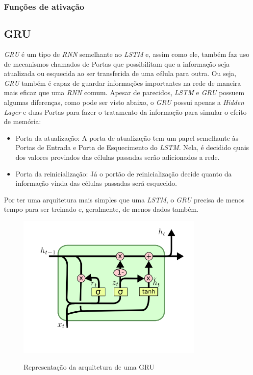 
\subsubsection{Funções de ativação}

\subsection{\acrfull{GRU}}


\textit{\acrshort{GRU}} é um tipo de \textit{\acrshort{RNN}} semelhante ao \textit{\acrshort{LSTM}} e, assim como ele, também faz uso de mecanismos chamados de Portas que possibilitam que a informação seja atualizada ou esquecida ao ser transferida de uma célula para outra. Ou seja, \textit{\acrshort{GRU}} também é capaz de guardar informações importantes na rede de maneira mais eficaz que uma \textit{\acrshort{RNN}} comum. Apesar de parecidos, \textit{\acrshort{LSTM}} e \textit{\acrshort{GRU}} possuem algumas diferenças, como pode ser visto abaixo, o \textit{\acrshort{GRU}} possui apenas a \textit{Hidden Layer} e duas Portas para fazer o tratamento da informação para simular o efeito de memória:

\begin{itemize}
    \item Porta da atualização: A porta de atualização tem um papel semelhante às Portas de Entrada e Porta de Esquecimento do \textit{\acrshort{LSTM}}. Nela, é decidido quais dos valores provindos das células passadas serão adicionados a rede.
    \item Porta da reinicialização: Já o portão de reinicialização decide quanto da informação vinda das células passadas será esquecido.
\end{itemize}

Por ter uma arquitetura mais simples que uma \textit{\acrshort{LSTM}}, o \textit{\acrshort{GRU}} precisa de menos tempo para ser treinado e, geralmente, de menos dados também.

\begin{figure}[htbp]
    \centering
    \includegraphics[scale=1.0]{monography/img/GRU.png}
    \label{figure:gru}
    \caption[Representação da arquitetura de uma GRU]{Representação da arquitetura de uma GRU\footnotemark}
\end{figure}